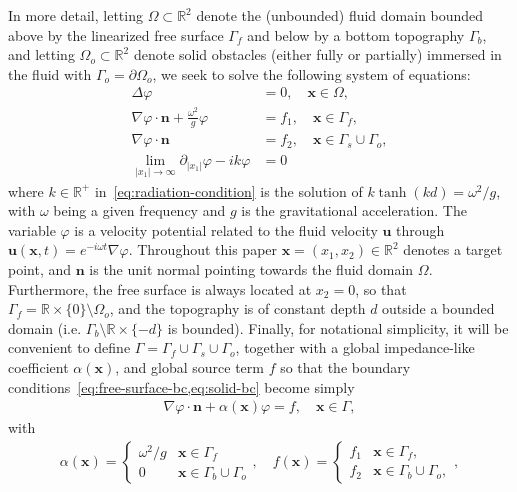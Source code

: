 \documentclass[11pt]{article}
\newcommand{\R}{\mathbb{R}}
\newcommand{\bn}{\mathbf{n}}
\newcommand{\bx}{\mathbf{x}}
\begin{document}
In more detail, letting $\Omega \subset \mathbb{R}^2$ denote the (unbounded)
fluid domain bounded above by the linearized free surface $\Gamma_f$ and below
by a bottom topography $\Gamma_b$, and letting $\Omega_o \subset \mathbb{R}^2$
denote solid obstacles (either fully or partially) immersed in the fluid with
$\Gamma_o = \partial \Omega_o$, we seek to solve the following system of equations:
%
\begin{subequations}
  \label{eq:water-waves-system}
  \begin{align}  
    \label{eq:laplace-equation}
    \Delta \varphi &=0, \quad \bx \in \Omega,\\
    \label{eq:free-surface-bc}
    \nabla \varphi \cdot \bn + \frac{\omega^2}{g}\varphi &=f_1, \quad \bx \in \Gamma_f,\\
    \label{eq:solid-bc}  
    \nabla \varphi \cdot \bn &=f_2, \quad \bx \in \Gamma_s \cup \Gamma_o,\\
    \label{eq:radiation-condition}  
    \lim_{|x_1| \to \infty} \partial_{|x_1|} \varphi - i k \varphi  &= 0
  \end{align}
\end{subequations}
%
where $k \in \mathbb{R}^+$ in~\cref{eq:radiation-condition} is the solution
of $k\tanh(kd) = \omega^2/g$, with $\omega$ being a given frequency and $g$ is
the gravitational acceleration. The variable $\varphi$ is a velocity potential
related to the fluid velocity $\boldsymbol{u}$ through $\boldsymbol{u}(\bx,t) =
e^{-i\omega t} \nabla \varphi$.  Throughout this paper $\bx = (x_1,x_2) \in \R^2$
denotes a target point, and $\bn$ is the unit normal pointing towards the fluid
domain $\Omega$. Furthermore, the free surface is always located at $x_2 = 0$,
so that $\Gamma_f = \R \times \{0\} \setminus \Omega_o$, and the topography is
of constant depth $d$ outside a bounded domain (i.e. $\Gamma_b \setminus \R
\times \{-d\}$ is bounded). Finally, for notational simplicity, it will be
convenient to define $\Gamma = \Gamma_f \cup \Gamma_s \cup \Gamma_o$, together
with a global impedance-like coefficient $\alpha(\bx)$, and global source term $f$ so
that the boundary conditions~\cref{eq:free-surface-bc,eq:solid-bc} become simply
%
\begin{align}
  \label{eq:global-bc}  
  \nabla \varphi \cdot \bn + \alpha(\bx) \varphi = f, \quad \bx \in \Gamma,
\end{align}
%
with
%
\begin{align}
  \label{eq:global-defs}  
  \alpha(\bx) = \begin{cases}
    \omega^2/g  &\bx \in \Gamma_f\\
    0   &\bx \in \Gamma_b \cup \Gamma_o
  \end{cases}, \quad
  f(\bx) = \begin{cases}
    f_1  &\bx \in \Gamma_f,\\
    f_2  &\bx \in \Gamma_b \cup \Gamma_o,
  \end{cases}, 
\end{align}
% 
\end{document}
